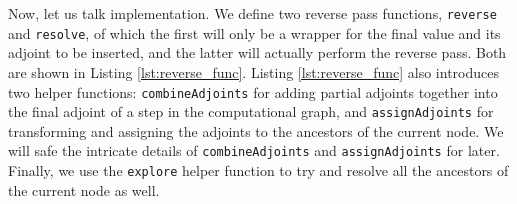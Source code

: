         Now, let us talk implementation.
        We define two reverse pass functions, \texttt{reverse} and \texttt{resolve}, of which the first will only be a wrapper for the final value and its adjoint to be inserted, and the latter will actually perform the reverse pass.
        Both are shown in Listing \ref{lst:reverse_func}.
        Listing \ref{lst:reverse_func} also introduces two helper functions: \texttt{combineAdjoints} for adding partial adjoints together into the final adjoint of a step in the computational graph, and \texttt{assignAdjoints} for transforming and assigning the adjoints to the ancestors of the current node.
        We will safe the intricate details of \texttt{combineAdjoints} and \texttt{assignAdjoints} for later.
        Finally, we use the \texttt{explore} helper function to try and resolve all the ancestors of the current node as well.

